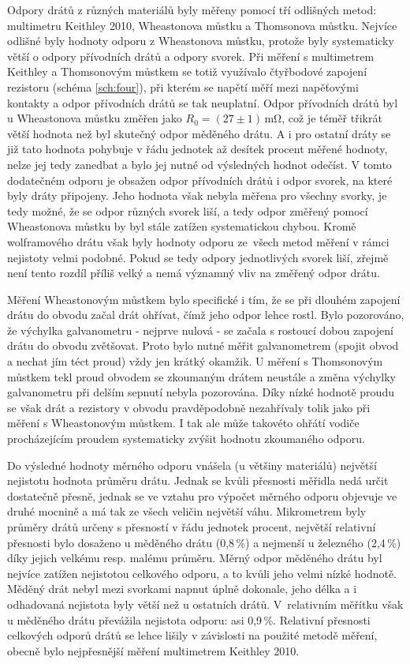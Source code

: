 \documentclass{../concepts/prepareprotokol} %
\begin{document}
Odpory drátů z různých materiálů byly měřeny pomocí tří odlišných metod: multimetru Keithley 2010, Wheastonova můstku a Thomsonova můstku. Nejvíce odlišné byly hodnoty odporu z Wheastonova můstku, protože byly systematicky větší o odpory přívodních drátů a odpory svorek. Při měření s multimetrem Keithley a Thomsonovým můstkem se totiž využívalo čtyřbodové zapojení rezistoru (schéma \ref{sch:four}), při kterém se napětí měří mezi napěťovými kontakty a odpor přívodních drátů se tak neuplatní. Odpor přívodních drátů byl u Wheastonova můstku změřen jako $R_0 = (27 \pm 1) \, \si{\milli\ohm}$, což je téměř třikrát větší hodnota než byl skutečný odpor měděného drátu. A i pro ostatní dráty se již tato hodnota pohybuje v řádu jednotek až desítek procent měřené hodnoty, nelze jej tedy zanedbat a bylo jej nutné od výsledných hodnot odečíst. V tomto dodatečném odporu je obsažen odpor přívodních drátů i odpor svorek, na které byly dráty připojeny. Jeho hodnota však nebyla měřena pro všechny svorky, je tedy možné, že se odpor různých svorek liší, a tedy odpor změřený pomocí Wheastonova můstku by byl stále zatížen systematickou chybou. Kromě wolframového drátu však byly hodnoty odporu ze~všech metod měření v rámci nejistoty velmi podobné. Pokud se tedy odpory jednotlivých svorek liší, zřejmě není tento rozdíl příliš velký a nemá významný vliv na změřený odpor drátu.

Měření Wheastonovým můstkem bylo specifické i tím, že se při dlouhém zapojení drátu do obvodu začal drát ohřívat, čímž jeho odpor lehce rostl. Bylo pozorováno, že výchylka galvanometru - nejprve nulová - se začala s rostoucí dobou zapojení drátu do obvodu zvětšovat. Proto bylo nutné měřit galvanometrem (spojit obvod a nechat jím téct proud) vždy jen krátký okamžik. U měření s Thomsonovým můstkem tekl proud obvodem se zkoumaným drátem neustále a změna výchylky galvanometru při delším sepnutí nebyla pozorována. Díky nízké hodnotě proudu se však drát a rezistory v obvodu pravděpodobně nezahřívaly tolik jako při měření s Wheastonovým můstkem. I tak ale může takovéto ohřátí vodiče procházejícím proudem systematicky zvýšit hodnotu zkoumaného odporu.

Do výsledné hodnoty měrného odporu vnášela (u většiny materiálů) největší nejistotu hodnota průměru drátu. Jednak se kvůli přesnosti měřidla nedá určit dostatečně přesně, jednak se ve vztahu pro výpočet měrného odporu objevuje ve druhé mocnině a má tak ze všech veličin největší váhu. Mikrometrem byly průměry drátů určeny s přesností v řádu jednotek procent, největší relativní přesnosti bylo dosaženo u měděného drátu (0,8\,\%) a nejmenší u železného (2,4\,\%) díky jejich velkému resp. malému průměru. Měrný odpor měděného drátu byl nejvíce zatížen nejistotou celkového odporu, a to kvůli jeho velmi nízké hodnotě. Měděný drát nebyl mezi svorkami napnut úplně dokonale, jeho délka a i odhadovaná nejistota byly větší než u ostatních drátů. V~relativním měřítku však u měděného drátu převážila nejistota odporu: asi 0,9\,\%. Relativní přesnosti celkových odporů drátů se lehce lišily v závislosti na použité metodě měření, obecně bylo nejpřesnější měření multimetrem Keithley 2010.
\end{document}
